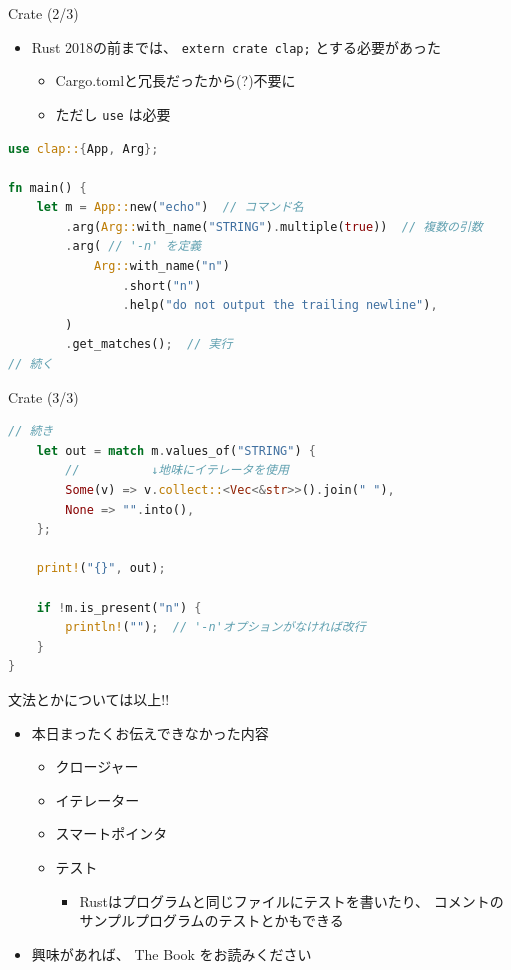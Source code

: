 \documentclass[cjk,dvipdfmx,10pt,compress,fragile%
hyperref={bookmarks=true,bookmarksnumbered=true,bookmarksopen=false,%
colorlinks=false,%
pdftitle={第 134 回 関西 Debian 勉強会},%
pdfauthor={小林},%
pdfsubject={資料},%
}]{beamer}
\begin{document}
\begin{frame}[t,fragile]{Crate (2/3)}
\begin{itemize}
 \item Rust 2018の前までは、 \verb|extern crate clap;| とする必要があった
       \begin{itemize}
	\item Cargo.tomlと冗長だったから(?)不要に
	\item ただし \verb|use| は必要
       \end{itemize}
\end{itemize}
\begin{lstlisting}[language=Rust,style=boxed,style=colouredRust,basicstyle=\small\tt,lineskip=-2pt]
use clap::{App, Arg};

fn main() {
    let m = App::new("echo")  // コマンド名
        .arg(Arg::with_name("STRING").multiple(true))  // 複数の引数
        .arg( // '-n' を定義
            Arg::with_name("n")
                .short("n")
                .help("do not output the trailing newline"),
        )
        .get_matches();  // 実行
// 続く\end{lstlisting}
\end{frame}

\begin{frame}[t,fragile]{Crate (3/3)}
\begin{lstlisting}[language=Rust,style=boxed,style=colouredRust,basicstyle=\small\tt,lineskip=-2pt]
// 続き
    let out = match m.values_of("STRING") {
        //          ↓地味にイテレータを使用
        Some(v) => v.collect::<Vec<&str>>().join(" "),
        None => "".into(),
    };

    print!("{}", out);

    if !m.is_present("n") {
        println!("");  // '-n'オプションがなければ改行
    }
}\end{lstlisting}
\end{frame}

\begin{frame}[t,fragile]{文法とかについては以上!!}
\begin{itemize}
 \item 本日まったくお伝えできなかった内容
       \begin{itemize}
	\item クロージャー
	\item イテレーター
	\item スマートポインタ
	\item テスト
	      \begin{itemize}
	       \item Rustはプログラムと同じファイルにテストを書いたり、
		     コメントのサンプルプログラムのテストとかもできる
	      \end{itemize}
       \end{itemize}
 \item 興味があれば、 The Book をお読みください
\end{itemize}
\end{frame}
\end{document}
